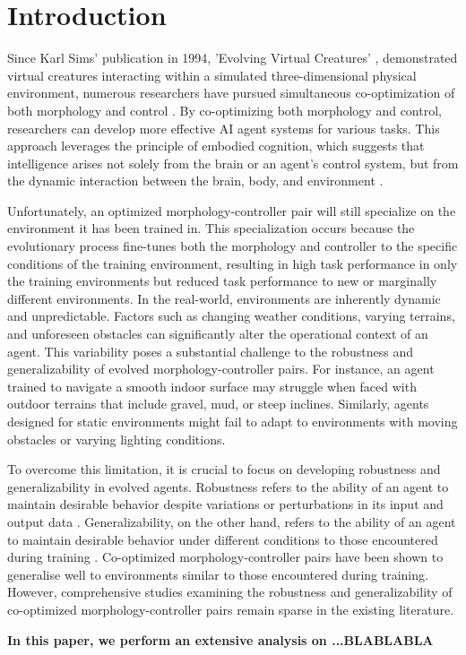 \section{Introduction}
Since Karl Sims' publication in 1994, 'Evolving Virtual Creatures' \cite{Karl_Sims_1994}, demonstrated virtual creatures interacting within a simulated three-dimensional physical environment, numerous researchers have pursued simultaneous co-optimization of both morphology and control \cite{Nick_Cheney_2017,Emma_Stensby_2021,Joshua_Auerbach_2014,Luis_2024}. By co-optimizing both morphology and control, researchers can develop more effective AI agent systems for various tasks. This approach leverages the principle of embodied cognition, which suggests that intelligence arises not solely from the brain or an agent's control system, but from the dynamic interaction between the brain, body, and environment \cite{Josh_Bongard_2013}.

Unfortunately, an optimized morphology-controller pair will still specialize on the environment it has been trained in. This specialization occurs because the evolutionary process fine-tunes both the morphology and controller to the specific conditions of the training environment, resulting in high task performance in only the training environments but reduced task performance to new or marginally different environments. In the real-world, environments are inherently dynamic and unpredictable. Factors such as changing weather conditions, varying terrains, and unforeseen obstacles can significantly alter the operational context of an agent. This variability poses a substantial challenge to the robustness and generalizability of evolved morphology-controller pairs. For instance, an agent trained to navigate a smooth indoor surface may struggle when faced with outdoor terrains that include gravel, mud, or steep inclines. Similarly, agents designed for static environments might fail to adapt to environments with moving obstacles or varying lighting conditions.

To overcome this limitation, it is crucial to focus on developing robustness and generalizability in evolved agents. Robustness refers to the ability of an agent to maintain desirable behavior despite variations or perturbations in its input and output data \cite{Ravi_Mangal_2019, Charles_Packer_2019, Xu_Mengdi_2022}. Generalizability, on the other hand, refers to the ability of an agent to maintain desirable behavior under different conditions to those encountered during training \cite{Charles_Packer_2019,Xu_Mengdi_2022}. Co-optimized morphology-controller pairs have been shown to generalise well to environments similar to those encountered during training. However, comprehensive studies examining the robustness and generalizability of co-optimized morphology-controller pairs remain sparse in the existing literature.

\textbf{In this paper, we perform an extensive analysis on ...BLABLABLA}

